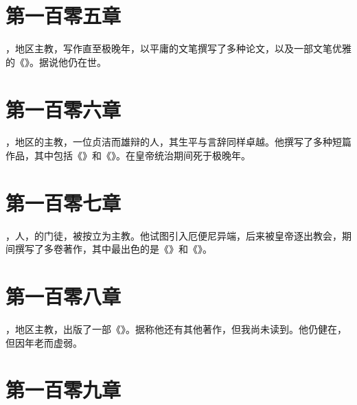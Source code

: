 \section{第一百零五章}

，地区主教，写作直至极晚年，以平庸的文笔撰写了多种论文，以及一部文笔优雅的《》。据说他仍在世。\par


\section{第一百零六章}

，地区的主教，一位贞洁而雄辩的人，其生平与言辞同样卓越。他撰写了多种短篇作品，其中包括《》和《》。在皇帝统治期间死于极晚年。\par


\section{第一百零七章}

，人，的门徒，被按立为主教。他试图引入厄便尼异端，后来被皇帝逐出教会，期间撰写了多卷著作，其中最出色的是《》和《》。\par


\section{第一百零八章}

，地区主教，出版了一部《》。据称他还有其他著作，但我尚未读到。他仍健在，但因年老而虚弱。\par


\section{第一百零九章}


